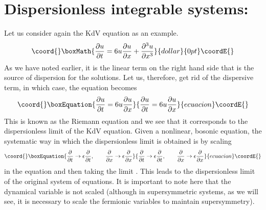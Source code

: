 \documentclass[a4paper,11pt]{article}
\begin{document}
\section{Dispersionless integrable systems:}

Let us consider again the KdV equation as an example.
$$\coord{}\boxMath{
{\partial u\over \partial t} = 6 u {\partial u\over \partial x} +
{\partial^{3} u\over \partial x^{3}}
}{dollar}{0pt}\coordE{}$$
As we have noted earlier, it is the linear term on the right hand side
that is the source of dispersion for the solutions. Let us, therefore,
get rid of the dispersive term, in which case, the equation becomes
\begin{equation}\coord{}\boxEquation{
{\partial u\over \partial t} = 6 u {\partial u\over \partial x}
}{
{\partial u\over \partial t} = 6 u {\partial u\over \partial x}
}{ecuacion}\coordE{}\end{equation}
This is known as the Riemann equation and we see that it corresponds
to the dispersionless limit of the KdV equation. Given a nonlinear,
bosonic equation, the systematic way in which the dispersionless limit
is obtained is by scaling
\begin{equation}\coord{}\boxEquation{
{\partial\over \partial t} \rightarrow \epsilon {\partial\over
\partial t},\qquad {\partial\over \partial x} \rightarrow \epsilon
{\partial \over \partial x}
}{
{\partial\over \partial t} \rightarrow \epsilon {\partial\over
\partial t},\qquad {\partial\over \partial x} \rightarrow \epsilon
{\partial \over \partial x}
}{ecuacion}\coordE{}\end{equation}
in the equation and then taking the limit \coordHE{}. This leads to the dispersionless limit of the original system of
equations. It is important to note here that the dynamical variable is
not scaled (although in supersymmetric systems, as we will see, it is
necessary to scale the fermionic variables to maintain supersymmetry).
\end{document}
